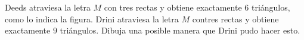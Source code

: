 Deeds atraviesa la letra $M$ con tres rectas y obtiene exactamente $6$ triángulos, como lo indica la figura. Drini atraviesa la letra $M$ contres rectas y obtiene exactamente $9$ triángulos. Dibuja una posible manera que Drini pudo hacer esto.